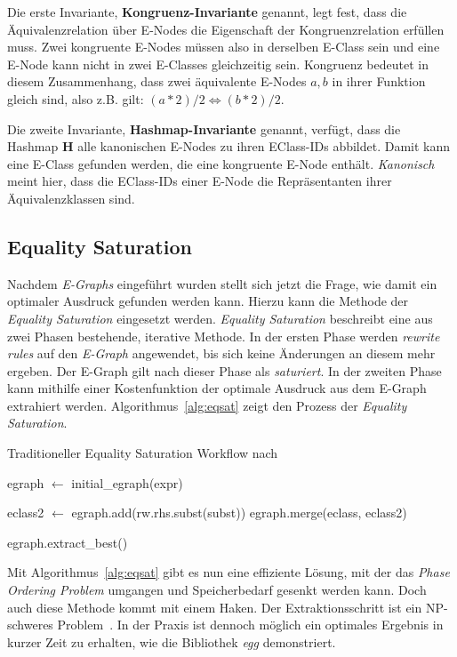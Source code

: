 Die erste Invariante, \textbf{Kongruenz-Invariante} genannt, legt fest, dass die Äquivalenzrelation über E-Nodes die Eigenschaft der Kongruenzrelation erfüllen muss.
Zwei kongruente E-Nodes müssen also in derselben E-Class sein und eine E-Node kann nicht in zwei E-Classes gleichzeitig sein.
Kongruenz bedeutet in diesem Zusammenhang, dass zwei äquivalente E-Nodes $a, b$ in ihrer Funktion gleich sind, also z.B. gilt: $(a * 2) / 2 \Leftrightarrow (b * 2) / 2$.

Die zweite Invariante, \textbf{Hashmap-Invariante} genannt, verfügt, dass die Hashmap $\mathbf{H}$ alle kanonischen E-Nodes zu ihren EClass-IDs abbildet.
Damit kann eine E-Class gefunden werden, die eine kongruente E-Node enthält. \textit{Kanonisch} meint hier, dass die EClass-IDs einer E-Node die Repräsentanten ihrer Äquivalenzklassen sind.

\subsection{Equality Saturation}

Nachdem \textit{E-Graphs} eingeführt wurden stellt sich jetzt die Frage, wie damit ein optimaler Ausdruck gefunden werden kann.
Hierzu kann die Methode der \textit{Equality Saturation} eingesetzt werden.
\textit{Equality Saturation} beschreibt eine aus zwei Phasen bestehende, iterative Methode.
In der ersten Phase werden \textit{rewrite rules} auf den \textit{E-Graph} angewendet, bis sich keine Änderungen an diesem mehr ergeben.
Der E-Graph gilt nach dieser Phase als \textit{saturiert}.
In der zweiten Phase kann mithilfe einer Kostenfunktion der optimale Ausdruck aus dem E-Graph extrahiert werden.
Algorithmus~\ref{alg:eqsat} zeigt den Prozess der \textit{Equality Saturation}.

\begin{algorithm}[H]
  \caption{Traditioneller Equality Saturation Workflow nach~\cite{2021-egg}}\label{alg:eqsat}
  \begin{algorithmic}
    \State egraph $\gets$ initial\_egraph(expr)
    
      
          \State  eclass2 $\gets$ egraph.add(rw.rhs.subst(subst))
          \State egraph.merge(eclass, eclass2)
        \EndFor 
      \EndFor
    \EndWhile

    \State \Return egraph.extract\_best()
    \EndFunction
  \end{algorithmic}
\end{algorithm}

Mit Algorithmus~\ref{alg:eqsat} gibt es nun eine effiziente Lösung, mit der das \textit{Phase Ordering Problem} umgangen und Speicherbedarf gesenkt werden kann.
Doch auch diese Methode kommt mit einem Haken. Der Extraktionsschritt ist ein NP-schweres Problem~\cite{phaseorder-2009}. In der Praxis ist dennoch möglich ein optimales
Ergebnis in kurzer Zeit zu erhalten, wie die Bibliothek \textit{egg} demonstriert.  
